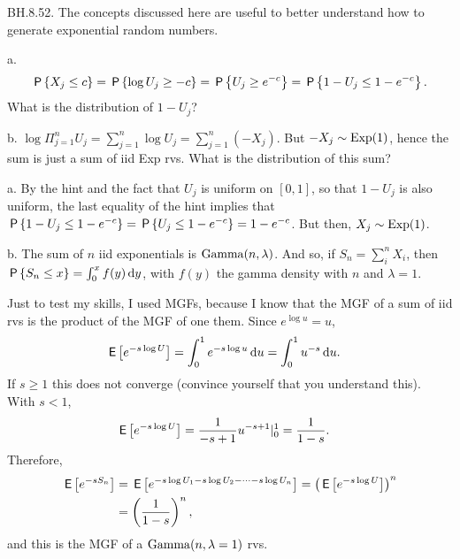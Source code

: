 \setcounter{theorem}{51}
\begin{exercise} BH.8.52. The concepts discussed here are useful to better understand how to generate exponential random numbers.
\begin{hint}
a.
\begin{align*}
\P{X_j\leq c} = \P{ \log U_{j} \geq -c} = \P{ U_{j} \geq e^{-c}} = \P{1-U_{j} \leq 1-e^{-c}}.
\end{align*}
What is the distribution of $1-U_{j}$?

b. $\log \Pi_{j=1}^{n} U_{j} = \sum_{j=1}^n \log U_j = \sum_{j=1}^n (-X_{j})$.  But $-X_j\sim \Exp{1}$, hence the sum is just a sum of iid Exp rvs. What is the distribution of this sum?

\end{hint}
\begin{solution}
a. By the  hint and  the fact that $U_j$ is uniform on $[0,1]$, so that $1-U_j$ is also uniform,  the last  equality of the hint implies  that
$\P{ 1-U_{j} \leq 1- e^{-c}} = \P{ U_{j} \leq 1-e^{-c}} =  1-e^{-c}$.
But then, $X_{j}\sim \Exp{1}$.

b. The sum of $n$ iid exponentials is $\Gamm{n, \lambda}$. And so, if $S_n=\sum_i^n X_{i}$, then $\P{S_n\leq x} = \int_{0}^{x}f(y) \d y$, with $f(y)$ the gamma density with $n$ and $\lambda=1$.

Just to test my skills, I used MGFs, because I know that the MGF of a sum of iid rvs is the product of the MGF of one them. Since $e^{\log u} = u$,
\begin{align*}
  \E{e^{-s \log U}} &= \int_{0}^1 e^{-s \log u}\d u = \int_{0}^{1} u^{-s}\d u.
\end{align*}
If $s\geq 1$ this does not converge (convince yourself that you understand this). With $s<1$,
\begin{align*}
  \E{e^{-s \log U}} &= \frac1 {-s+1} u^{-s+1}|_0^1 = \frac{1}{1-s}.
\end{align*}
Therefore,
\begin{align*}
  \E{e^{-s S_n}}
  &=  \E{e^{-s \log U_1 -s \log U_2 - \cdots -s \log U_n}}
  = \left(\E{e^{-s\log U}}\right)^n \\
  &= \left(\frac{1}{1-s}\right)^{n},
\end{align*}
and this is the MGF of a $\Gamm{n, \lambda=1}$ rvs.
\end{solution}
\end{exercise}

\setcounter{theorem}{53}

